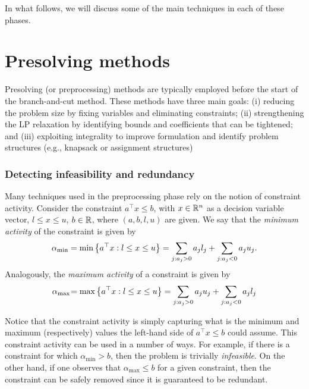 In what follows, we will discuss some of the main techniques in each of these phases. 


\section{Presolving methods}

Presolving (or preprocessing) methods are typically employed before the start of the branch-and-cut method. These methods have three main goals: (i) reducing the problem size by fixing variables and eliminating constraints; (ii) strengthening the LP relaxation by identifying bounds and coefficients that can be tightened; and (iii) exploiting integrality to improve formulation and identify problem structures (e.g., knapsack or assignment structures)


\subsubsection{Detecting infeasibility and redundancy}

Many techniques used in the preprocessing phase rely on the notion of constraint activity. Consider the constraint $a^\top x \leq b$, with $x \in \mathbb{R}^n$ as a decision variable vector, $l \leq x \leq u$, $b \in \mathbb{R}$, where $(a,b,l,u)$ are given. We say that the \emph{minimum activity} of the constraint is given by
%
\begin{equation*}
	\alpha_{\text{min}} = \min\left\{ a^\top x : l \leq x \leq u \right \} = \sum_{j : a_j > 0}a_jl_j + \sum_{j : a_j < 0}a_j u_j.	
\end{equation*}
%
Analogously, the \emph{maximum activity} of a constraint is given by 
%
\begin{equation*}
	\alpha_{\text{max}} \hspace{-2pt} = \max\left\{ a^\top x : l \leq x \leq u \right \} = \sum_{j : a_j > 0}a_ju_j + \sum_{j : a_j < 0}a_jl_j
\end{equation*}

Notice that the constraint activity is simply capturing what is the minimum and maximum (respectively) values the left-hand side of $a^\top x \leq b$ could assume. This constraint activity can be used in a number of ways. For example, if there is a constraint for which $\alpha_{\text{min}} > b$, then the problem is trivially \emph{infeasible}. On the other hand, if one observes that $\alpha_{\text{max}} \leq b$ for a given constraint, then the constraint can be safely removed since it is guaranteed to be redundant.


